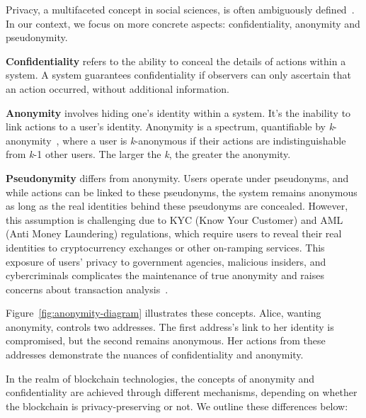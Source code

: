 \documentclass[pdftex,twocolumn,epjc3]{svjour3}
\begin{document}
\begin{sloppypar}
Privacy, a multifaceted concept in social sciences, is often ambiguously defined~\cite{smithInformationPrivacyResearch2011}. In our context, we focus on more concrete aspects: confidentiality, anonymity and pseudonymity.
\end{sloppypar}

\textbf{Confidentiality} refers to the ability to conceal the details of actions within a system. A system guarantees confidentiality if observers can only ascertain that an action occurred, without additional information.

\textbf{Anonymity} involves hiding one's identity within a system. It's the inability to link actions to a user's identity. Anonymity is a spectrum, quantifiable by \textit{k}-anonymity~\cite{sweeneyKanonymityModelProtecting2002}, where a user is \textit{k}-anonymous if their actions are indistinguishable from \textit{k}-1 other users. The larger the \textit{k}, the greater the anonymity.

\begin{sloppypar}
\textbf{Pseudonymity} differs from anonymity. Users operate under pseudonyms, and while actions can be linked to these pseudonyms, the system remains anonymous as long as the real identities behind these pseudonyms are concealed. However, this assumption is challenging due to KYC (Know Your Customer) and AML (Anti Money Laundering) regulations, which require users to reveal their real identities to cryptocurrency exchanges or other on-ramping services. This exposure of users' privacy to government agencies, malicious insiders, and cybercriminals complicates the maintenance of true anonymity and raises concerns about transaction analysis~\cite{androulakiEvaluatingUserPrivacy2013, oberStructureAnonymityBitcoin2013}.

Figure~\ref{fig:anonymity-diagram} illustrates these concepts. Alice, wanting anonymity, controls two addresses. The first address's link to her identity is compromised, but the second remains anonymous. Her actions from these addresses demonstrate the nuances of confidentiality and anonymity.
\end{sloppypar}

In the realm of blockchain technologies, the concepts of anonymity and confidentiality are achieved through different mechanisms, depending on whether the blockchain is privacy-preserving or not. We outline these differences below:
\end{document}
